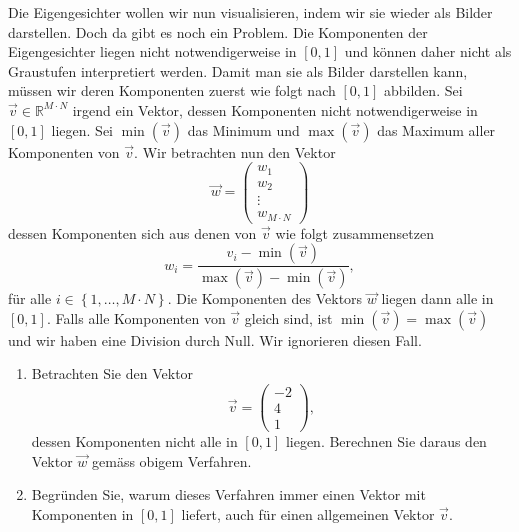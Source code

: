 Die Eigengesichter wollen wir nun visualisieren, indem wir sie wieder als Bilder darstellen.
Doch da gibt es noch ein Problem.
Die Komponenten der Eigengesichter liegen nicht notwendigerweise in $\left[0,1\right]$ und können daher nicht als Graustufen interpretiert werden.
Damit man sie als Bilder darstellen kann, müssen wir deren Komponenten zuerst wie folgt nach $\left[0,1\right]$ abbilden.
Sei $\vec v\in\mathbb R^{M\cdot N}$ irgend ein Vektor, dessen Komponenten nicht notwendigerweise in $\left[0,1\right]$ liegen.
Sei $\min\left(\vec v\right)$ das Minimum und $\max\left(\vec v\right)$ das Maximum aller Komponenten von $\vec v$.
Wir betrachten nun den Vektor
\begin{equation*}
	\vec w=
	\begin{pmatrix}
		w_1 \\
		w_2 \\
		\vdots \\
		w_{M\cdot N}
	\end{pmatrix}
\end{equation*}
dessen Komponenten sich aus denen von $\vec v$ wie folgt zusammensetzen
\begin{equation*}
	w_i=\frac{v_i-\min\left(\vec v\right)}{\max\left(\vec v\right)-\min\left(\vec v\right)},
\end{equation*}
für alle $i\in\left\{1,\ldots,M\cdot N\right\}$.
Die Komponenten des Vektors $\vec w$ liegen dann alle in $\left[0,1\right]$.
Falls alle Komponenten von $\vec v$ gleich sind, ist $\min\left(\vec v\right)=\max\left(\vec v\right)$ und wir haben eine Division durch Null.
Wir ignorieren diesen Fall.
\begin{aufgabe} \label{aufg:scaling_theory}
	\phantom{text}
	\begin{enumerate}[label=(\alph*)]
		\item Betrachten Sie den Vektor
		\begin{equation*}
			\vec v=
			\begin{pmatrix}
				-2 \\
				4 \\
				1
			\end{pmatrix},
		\end{equation*}
		dessen Komponenten nicht alle in $\left[0,1\right]$ liegen.
		Berechnen Sie daraus den Vektor $\vec w$ gemäss obigem Verfahren.
		\item Begründen Sie, warum dieses Verfahren immer einen Vektor mit Komponenten in $\left[0,1\right]$ liefert, auch für einen allgemeinen Vektor $\vec v$.
	\end{enumerate}
\end{aufgabe}
